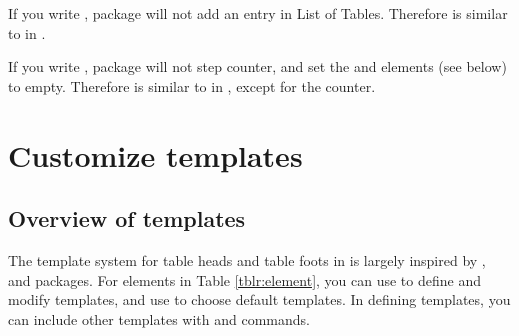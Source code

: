 \documentclass[oneside]{book}
\begin{document}
If you write ,  package will not add an entry in List of Tables.
Therefore  is similar to  in .

If you write ,  package will not step  counter,
and set the  and  elements (see below) to empty.
Therefore  is similar to 
in , except for the counter.

\section{Customize templates}

\subsection{Overview of templates}

The template system for table heads and table foots in  is largely inspired
by ,  and  packages. For elements in Table \ref{tblr:element},
you can use \CC{\DeclareTblrTemplate} to define and modify templates,
and use \CC{\SetTblrTemplate} to choose default templates. In defining templates,
you can include other templates with \CC{\UseTblrTemplate} and \CC{\ExpTblrTemplate} commands.
\end{document}

